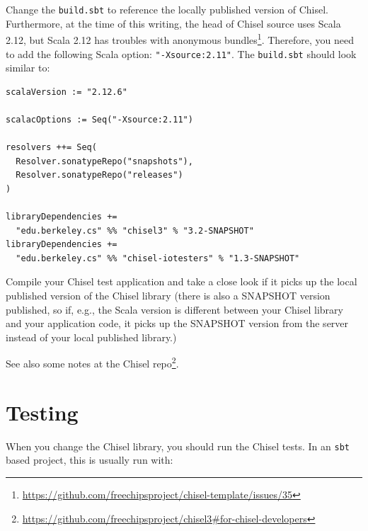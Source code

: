 \documentclass[%
    10pt,
    headinclude, footexclude,
    openright, %
    notitlepage,
    cleardoubleempty,
    headsepline,
    pointlessnumbers,
    bibtotoc, idxtotoc,
    ]{scrbook}
\newcommand{\code}[1]{{\small{\texttt{#1}}}}
\newcommand{\myref}[2]{\href{#1}{#2}}
\renewcommand{\myref}[2]{{#2}{\footnote{\url{#1}}}}
\begin{document}
Change the \code{build.sbt} to reference the locally published version of Chisel.
Furthermore, at the time of this writing, the head of Chisel source uses Scala 2.12, but Scala
2.12 has troubles with
\myref{https://github.com/freechipsproject/chisel-template/issues/35}{anonymous bundles}.
Therefore, you need to add the following Scala option: \code{"-Xsource:2.11"}.
The \code{build.sbt} should look similar to:

\begin{verbatim}
scalaVersion := "2.12.6"

scalacOptions := Seq("-Xsource:2.11")

resolvers ++= Seq(
  Resolver.sonatypeRepo("snapshots"),
  Resolver.sonatypeRepo("releases")
)

libraryDependencies +=
  "edu.berkeley.cs" %% "chisel3" % "3.2-SNAPSHOT"
libraryDependencies +=
  "edu.berkeley.cs" %% "chisel-iotesters" % "1.3-SNAPSHOT"
\end{verbatim}

Compile your Chisel test application and take a close look if it picks up the local published
version of the Chisel library (there is also a SNAPSHOT version published, so if, e.g.,
the Scala version is different between your Chisel library and your application code,
it picks up the SNAPSHOT version from the server instead of your local published
library.)

See also \myref{https://github.com/freechipsproject/chisel3\#for-chisel-developers}{some notes
at the Chisel repo}.

\section{Testing}

When you change the Chisel library, you should run the Chisel tests.
In an \code{sbt} based project, this is usually run with:
\end{document}
